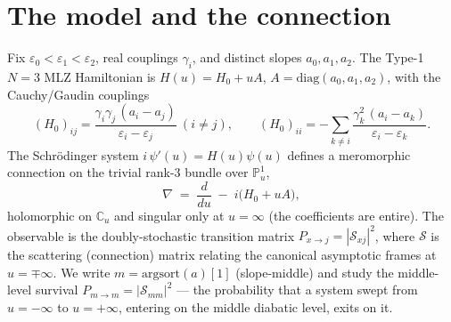 \documentclass[11pt]{article}
\theoremstyle{definition}
\newcommand{\eps}{\varepsilon}
\newcommand{\C}{\mathbb{C}}
\newcommand{\PP}{\mathbb{P}^1}
\newcommand{\diag}{\mathrm{diag}}
\newcommand{\Scat}{\mathcal{S}}
\newcommand{\Pmid}{P_{m\to m}}
\begin{document}
\section{The model and the connection}\label{sec:model}

Fix $\eps_0<\eps_1<\eps_2$, real couplings $\gamma_i$, and distinct slopes $a_0,a_1,a_2$. The Type-1 $N{=}3$
MLZ Hamiltonian is $H(u)=H_0+uA$, $A=\diag(a_0,a_1,a_2)$, with the Cauchy/Gaudin couplings
\begin{equation}
(H_0)_{ij}=\frac{\gamma_i\gamma_j\,(a_i-a_j)}{\eps_i-\eps_j}\ (i\neq j),\qquad
(H_0)_{ii}=-\sum_{k\neq i}\frac{\gamma_k^2\,(a_i-a_k)}{\eps_i-\eps_k}.
\end{equation}
The Schr\"odinger system $i\,\psi'(u)=H(u)\psi(u)$ defines a meromorphic connection on the trivial rank-$3$
bundle over $\PP_u$,
\begin{equation}\label{eq:conn}
\nabla \;=\; \frac{d}{du}\;-\;i\big(H_0+uA\big),
\end{equation}
holomorphic on $\C_u$ and singular only at $u=\infty$ (the coefficients are entire). The observable is the
doubly-stochastic transition matrix $P_{x\to j}=|\Scat_{xj}|^2$, where $\Scat$ is the scattering
(connection) matrix relating the canonical asymptotic frames at $u=\mp\infty$. We write $m=\mathrm{argsort}(a)[1]$
(slope-middle) and study the middle-level survival $\Pmid=|\Scat_{mm}|^2$ --- the probability that a system
swept from $u=-\infty$ to $u=+\infty$, entering on the middle diabatic level, exits on it.
\end{document}
